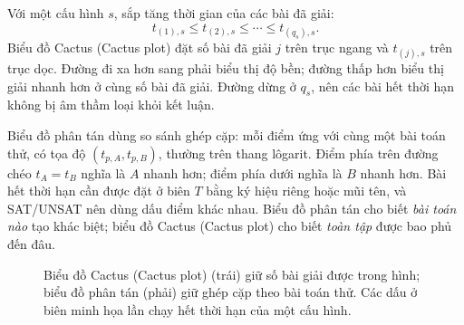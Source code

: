 Với một cấu hình \(s\), sắp tăng thời gian của các bài đã giải:
\[
  t_{(1),s}\le t_{(2),s}\le\cdots\le t_{(q_s),s}.
\]
Biểu đồ Cactus (Cactus plot) đặt số bài đã giải \(j\) trên trục ngang và
\(t_{(j),s}\) trên trục dọc. Đường đi xa hơn sang phải biểu thị độ bền; đường
thấp hơn biểu thị giải nhanh hơn ở cùng số bài đã giải. Đường dừng ở \(q_s\),
nên các bài hết thời hạn không bị âm thầm loại khỏi kết luận.

Biểu đồ phân tán dùng so sánh ghép cặp: mỗi điểm ứng với cùng một bài toán thử,
có tọa độ \((t_{p,A},t_{p,B})\), thường trên thang lôgarit. Điểm phía trên đường chéo
\(t_A=t_B\) nghĩa là \(A\) nhanh hơn; điểm phía dưới nghĩa là \(B\) nhanh hơn.
Bài hết thời hạn cần được đặt ở biên \(T\) bằng ký hiệu riêng hoặc mũi tên, và
SAT/UNSAT nên dùng dấu điểm khác nhau. Biểu đồ phân tán cho biết \emph{bài toán
nào} tạo khác biệt; biểu đồ Cactus (Cactus plot) cho biết \emph{toàn tập} được bao phủ
đến đâu.

\begin{figure}[tb]
\centering
{}
\caption{Biểu đồ Cactus (Cactus plot) (trái) giữ số bài giải được trong hình; biểu đồ
phân tán (phải) giữ ghép cặp theo bài toán thử. Các dấu ở biên minh họa lần
chạy hết thời hạn của một cấu hình.}
\label{fig:cactus-scatter}
\end{figure}

